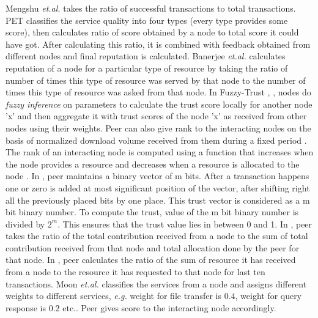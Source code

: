 \documentclass{IEEEtran}
\begin{document}
Mengshu \emph{et.al.} \cite{A trust model of p2p system based on confirmation
theory} takes the ratio of successful transactions to total transactions. PET
\cite {Pet} classifies the service quality into four types (every type provides
some score), then calculates ratio of score obtained by a node to total score it
could have got. After calculating this ratio, it is combined with feedback
obtained from different nodes and final reputation is calculated. Banerjee
\emph{et.al.} \cite{reciprocal} calculates reputation of a node for a particular
type of resource by taking the ratio of number of times this type of resource
was served by that node to the number of times this type of resource was asked from that
node. In Fuzzy-Trust \cite{FuzzyTrust}, \cite{fuzzy approach}, nodes do
\emph{fuzzy inference} on parameters to calculate the trust score locally for
another node 'x' and then aggregate it with trust scores of the node 'x' as
received from other nodes using their weights. Peer can also give rank to the
interacting nodes on the basis of normalized download volume received from them during a fixed period \cite{multi lavel tit for tat}.  The rank of an interacting node is computed using a function that increases when the node provides a resource and decreases when a resource is allocated to the node \cite{Ranking-based Optimal Resource Allocation}. In \cite{A Reputation-based Trust Management}, peer maintains a binary vector of m bits. After a transaction happens one or zero is added at most significant position of the vector, after shifting right all the previously placed bits by one place. This trust vector is considered as a m bit binary number. To compute the trust, value of the m 
bit binary number is divided by $2^{m}$. This ensures that the trust value lies in between 0 and 1. In \cite{R2P}, peer takes the ratio of the total contribution received from a node to the sum of total contribution received from that node and total allocation done by the peer for that node. In \cite{Reputation-based resource allocation}, peer calculates the ratio of the sum of resource it has received from a node to the resource it has requested  to that node for last ten transactions. Moon \emph{et.al.} \cite{Point Based} classifies the services from a node and assigns  different weights to different services, \emph{e.g.}  weight for file transfer is $0.4$, weight for query response is $0.2$ etc.. Peer gives score to the interacting node accordingly.
\end{document}
